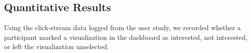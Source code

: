 \subsection{Quantitative Results}
 Using the click-stream data logged from the user study, we recorded whether a participant marked a visualization in the dashboard as interested, not interested, or left the visualization unselected. %
